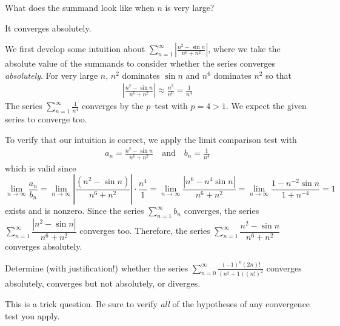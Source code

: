 \begin{hint}
What does the summand look like when $n$ is very large?
\end{hint}

\begin{answer}
It converges absolutely.
\end{answer}

\begin{solution}
We first develop some intuition about $\displaystyle\sum_{n=1}^\infty\left|\frac{n^2-\sin n}{n^6+n^2}\right|$, where we take the absolute value of the summands to consider whether the series converges \emph{absolutely}. For very large $n$, $n^2$ dominates
$\sin n$ and $n^6$ dominates $n^2$ so that
\begin{align*}
\left|\frac{n^2-\sin n}{n^6+n^2}\right|
\approx \frac{n^2}{n^6}
=\frac{1}{n^4}
\end{align*}
The series $\displaystyle \sum_{n=1}^{\infty} \frac{1}{n^4}$
converges by the $p$--test with $p=4>1$.
We expect the given series to converge too.

To verify that  our intuition is correct,
we apply the limit comparison test with
\begin{align*}
a_n= \frac{n^2-\sin n}{n^6+n^2} \quad\text{and}\quad b_n= \frac{1}{n^4}
\end{align*}
which is valid since
\begin{equation*}
\lim_{n\rightarrow\infty} \frac{a_n}{b_n}
=\lim_{n\rightarrow\infty}\left|\frac{(n^2-\sin n)}{n^6+n^2}\right|\cdot\frac{n^4}{1}
=\lim_{n\rightarrow\infty}\frac{|n^6-n^4\sin n|}{n^6+n^2}
=\lim_{n\rightarrow\infty}\frac{1-n^{-2}\sin n}{1+n^{-4}}
=1
\end{equation*}
exists and is nonzero. Since the series $\sum\limits_{n=1}^\infty b_n$
converges, the series $\sum\limits_{n=1}^\infty\dfrac{|n^2-\sin n|}{n^6+n^2}$ converges too. Therefore, the series $\sum\limits_{n=1}^\infty\dfrac{n^2-\sin n}{n^6+n^2}$ converges absolutely.
\end{solution}

\begin{Mquestion}[2012A]
Determine (with justification!) whether the series
$\displaystyle\sum_{n=0}^\infty\frac{(-1)^n(2n)!}{(n^2+1)(n!)^2}$
converges absolutely, converges but not absolutely, or diverges.
\end{Mquestion}

\begin{hint}
This is a trick question. Be sure to verify \emph{all} of the hypotheses
of any convergence test you apply.
\end{hint}

